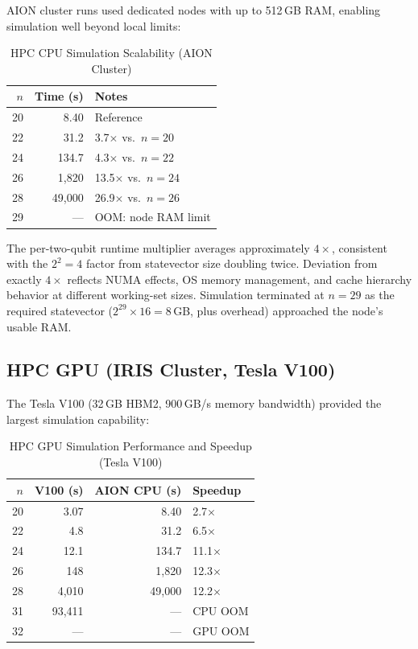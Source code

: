 \documentclass[sigconf, authorversion, nonacm]{acmart}
\begin{document}
AION cluster runs used dedicated nodes with up to 512\,GB RAM, enabling simulation well beyond local limits:

\begin{table}[htbp]
\centering
\caption{HPC CPU Simulation Scalability (AION Cluster)}
\label{tab:hpc_cpu}
\begin{tabular}{rrl}
\toprule
$n$ & Time (s) & Notes \\
\midrule
20 & 8.40    & Reference \\
22 & 31.2    & 3.7$\times$ vs.\ $n{=}20$ \\
24 & 134.7   & 4.3$\times$ vs.\ $n{=}22$ \\
26 & 1,820   & 13.5$\times$ vs.\ $n{=}24$ \\
28 & 49,000  & 26.9$\times$ vs.\ $n{=}26$ \\
29 & ---     & OOM: node RAM limit \\
\bottomrule
\end{tabular}
\end{table}

The per-two-qubit runtime multiplier averages approximately $4\times$, consistent with the $2^2 = 4$ factor from statevector size doubling twice. Deviation from exactly $4\times$ reflects NUMA effects, OS memory management, and cache hierarchy behavior at different working-set sizes. Simulation terminated at $n=29$ as the required statevector ($2^{29} \times 16 = 8$\,GB, plus overhead) approached the node's usable RAM.

\subsection{HPC GPU (IRIS Cluster, Tesla V100)}

The Tesla V100 (32\,GB HBM2, 900\,GB/s memory bandwidth) provided the largest simulation capability:

\begin{table}[htbp]
\centering
\caption{HPC GPU Simulation Performance and Speedup (Tesla V100)}
\label{tab:hpc_gpu}
\begin{tabular}{rrrl}
\toprule
$n$ & V100 (s) & AION CPU (s) & Speedup \\
\midrule
20 & 3.07   & 8.40    & 2.7$\times$ \\
22 & 4.8    & 31.2    & 6.5$\times$ \\
24 & 12.1   & 134.7   & 11.1$\times$ \\
26 & 148    & 1,820   & 12.3$\times$ \\
28 & 4,010  & 49,000  & 12.2$\times$ \\
31 & 93,411 & ---     & CPU OOM \\
32 & ---    & ---     & GPU OOM \\
\bottomrule
\end{tabular}
\end{table}
\end{document}
